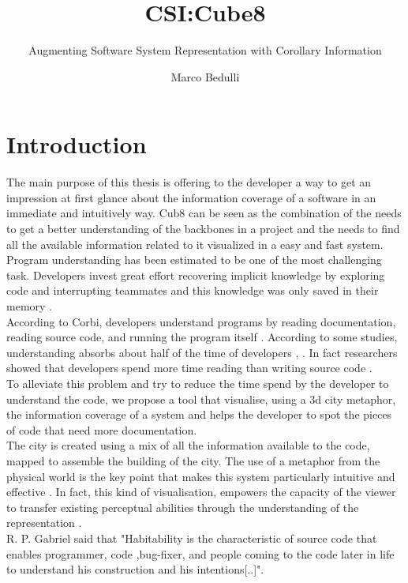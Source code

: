 \documentclass[]{usiinfbachelorproject}
\author{Marco Bedulli}
\title{CSI:Cube8}
\subtitle{Augmenting Software System Representation with Corollary Information}
\begin{document}
\maketitle

\tableofcontents 


\pagebreak
\listoffigures

\pagebreak

\section{Introduction} \label{introduction}

The main purpose of this thesis is offering to the developer a way to get an impression at first glance about the information coverage of a software in an immediate and intuitively way. Cub8 can be seen as the combination of the needs to get a better understanding of the backbones in a project and the needs to find all the available information related to it visualized in a easy and fast system.
Program understanding has been estimated to be one of the most challenging task.
Developers invest great effort recovering implicit knowledge by exploring code and interrupting teammates and this knowledge was only saved in their memory \cite{LaToza}.\\
According to Corbi, developers understand programs by reading documentation, reading source code, and running the program itself
\cite{Corbi}. According to some studies, understanding absorbs about half of the time of developers \cite{Corbi}, \cite{Guimaraes}. In fact researchers showed that developers spend more time reading than writing source code \cite{Mayrhauser}.\\
To alleviate this problem and try to reduce the time spend by the developer to understand the code, we propose a tool that visualise, using a 3d city metaphor, the information coverage of a system and helps the developer to spot the pieces of code that need more documentation. \\
The city is created using a mix of all the information available to the code, mapped to assemble the building of the city. The use of a metaphor from the physical world is the key point that makes this system particularly intuitive and effective \cite{SoftwareWorld}. In fact, this kind of visualisation, empowers the capacity of the viewer to transfer existing perceptual abilities through the understanding of the representation \cite{programComp}.\\
R. P. Gabriel \cite{gabry} said that "Habitability is the characteristic of source code that enables programmer, code ,bug-fixer, and people coming to the code later in life to understand his construction and his intentions[..]". 
\end{document}
